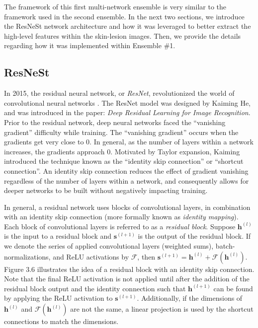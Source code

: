 \documentclass [MAS] {uclathes}
\begin{document}
The framework of this first multi-network ensemble is very similar to the framework used in the second ensemble. In the next two sections, we introduce the ResNeSt network architecture and how it was leveraged to better extract the high-level features within the skin-lesion images. Then, we provide the details regarding how it was implemented within Ensemble \#1.

\subsection{ResNeSt}

In 2015, the residual neural network, or \textit{ResNet}, revolutionized the world of convolutional neural networks \cite{resnet}. The ResNet model was designed by Kaiming He, and was introduced in the paper: \textit{Deep Residual Learning for Image Recognition}. Prior to the residual network, deep neural networks faced the ``vanishing gradient'' difficulty while training. The ``vanishing gradient'' occurs when the gradients get very close to 0. In general, as the number of layers within a network increases, the gradients approach 0. Motivated by Taylor expansion, Kaiming introduced the technique known as the ``identity skip connection'' or ``shortcut connection''. An identity skip connection reduces the effect of gradient vanishing regardless of the number of layers within a network, and consequently allows for deeper networks to be built without negatively impacting training. 

In general, a residual network uses blocks of convolutional layers, in combination with an identity skip connection (more formally known as \textit{identity mapping}). Each block of convolutional layers is referred to as a \textit{residual block}. Suppose $\mathbf{h}^{(l)}$ is the input to a residual block and $\mathbf{s}^{(l+1)}$ is the output of the residual block. If we denote the series of applied convolutional layers (weighted sums), batch-normalizations, and ReLU activations by $\mathcal{F}$, then $\mathbf{s}^{(l+1)} = \mathbf{h}^{(l)} + \mathcal{F}(\mathbf{h}^{(l)})$. Figure 3.6 illustrates the idea of a residual block with an identity skip connection. Note that the final ReLU activation is not applied until after the addition of the residual block output and the identity connection such that $\mathbf{h}^{(l+1)}$ can be found by applying the ReLU activation to $\mathbf{s}^{(l+1)}$. Additionally, if the dimensions of $\mathbf{h}^{(l)}$ and $\mathcal{F}(\mathbf{h}^{(l)})$ are not the same, a linear projection is used by the shortcut connections to match the dimensions.
\end{document}
